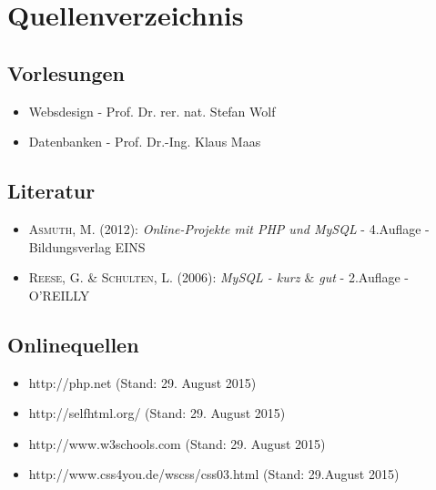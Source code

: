 \newpage
\section{Quellenverzeichnis}

\subsection*{Vorlesungen}
\begin{itemize}
	\item Websdesign - Prof. Dr. rer. nat. Stefan Wolf
	\item Datenbanken - Prof. Dr.-Ing. Klaus Maas  
\end{itemize}

\subsection*{Literatur}
\begin{itemize}
	\item \textsc{Asmuth, M.} (2012): \textit{Online-Projekte mit PHP und MySQL} -  4.Auflage - \\ Bildungsverlag EINS
	\item \textsc{Reese, G. \&  Schulten, L.} (2006): \textit{MySQL - kurz $\&$ gut} -  2.Auflage - O'REILLY
\end{itemize}

\subsection*{Onlinequellen}
\begin{itemize}
	\item http://php.net (Stand: 29. August 2015)
	\item http://selfhtml.org/ (Stand: 29. August 2015)
	\item http://www.w3schools.com (Stand: 29. August 2015)
	\item http://www.css4you.de/wscss/css03.html (Stand: 29.August 2015)
\end{itemize}